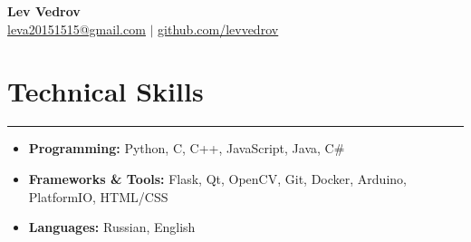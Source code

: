 \documentclass[letterpaper, 10pt]{article}
\begin{document}
\begin{center}
    \textbf{\LARGE Lev Vedrov} \\ \vspace{2pt}
    \href{mailto:leva20151515@gmail.com}{\underline{leva20151515@gmail.com}} $|$
    \href{https://github.com/levvedrov}{\underline{github.com/levvedrov}}
\end{center}

\section*{Technical Skills}
\hrule
\vspace{4pt}
\begin{itemize}
    \item[] \textbf{Programming:} Python, C, C++, JavaScript, Java, C\#
    \item[] \textbf{Frameworks \& Tools:} Flask, Qt, OpenCV, Git, Docker, Arduino, PlatformIO, HTML/CSS
    \item[] \textbf{Languages:} Russian, English
\end{itemize}

\end{document}
